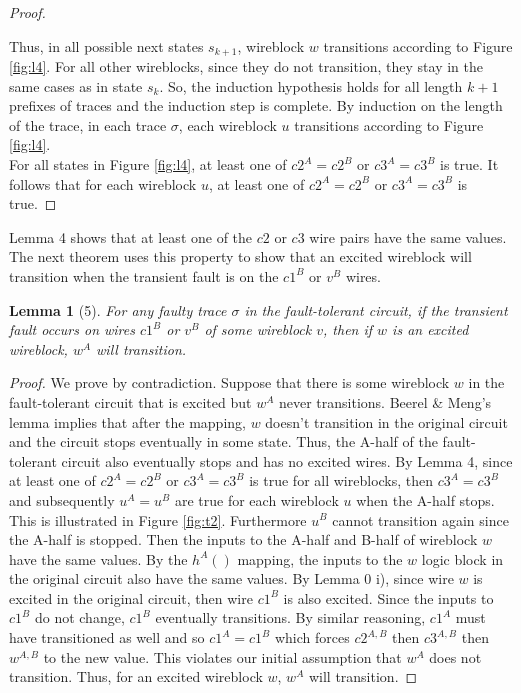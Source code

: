 \documentclass[12pt]{report}
\newtheorem*{lemma}{Lemma}
\begin{document}
\begin{proof}
\begin{itemize}
\end{itemize}
Thus, in all possible next states $s_{k+1}$, wireblock $w$ transitions according to Figure \ref{fig:l4}. For all other wireblocks, since they do not transition, they stay in the same cases as in state $s_k$. So, the induction hypothesis holds for all length $k+1$ prefixes of traces and the induction step is complete. 
By induction on the length of the trace, in each trace $\sigma$, each wireblock $u$ transitions according to Figure \ref{fig:l4}. \\ 
For all states in Figure \ref{fig:l4}, at least one of $c2^A=c2^B$ or $c3^A=c3^B$ is true. It follows that for each wireblock $u$, at least one of $c2^A=c2^B$ or $c3^A=c3^B$ is true.
\end{proof}
Lemma 4 shows that at least one of the $c2$ or $c3$ wire pairs have the same values. The next theorem uses this property to show that an excited wireblock will transition when the transient fault is on the $c1^B$ or $v^B$ wires.\\

\begin{lemma}[5]
For any faulty trace $\sigma$ in the fault-tolerant circuit, if the transient fault occurs on wires $c1^B$ or $v^B$ of some wireblock $v$, then if $w$ is an excited wireblock, $w^A$ will transition.
\end{lemma}
\begin{proof}
We prove by contradiction. Suppose that there is some wireblock $w$ in the fault-tolerant circuit that is excited but $w^A$ never transitions. Beerel \& Meng's lemma implies that after the mapping, $w$ doesn't transition in the original circuit and the circuit stops eventually in some state. Thus, the A-half of the fault-tolerant circuit also eventually stops and has no excited wires. By Lemma 4, since at least one of $c2^A=c2^B$ or $c3^A=c3^B$ is true for all wireblocks, then $c3^A=c3^B$ and subsequently $u^A=u^B$ are true for each wireblock $u$ when the A-half stops.  This is illustrated in Figure \ref{fig:t2}.  Furthermore $u^B$ cannot transition again since the A-half is stopped.  Then the inputs to the A-half and B-half of wireblock $w$ have the same values.  By the $h^A()$ mapping, the inputs to the $w$ logic block in the original circuit also have the same values.  By Lemma 0 i), since wire $w$ is excited in the original circuit, then wire $c1^B$ is also excited. Since the inputs to $c1^B$ do not change, $c1^B$ eventually transitions. By similar reasoning, $c1^A$ must have transitioned as well and so $c1^A=c1^B$ which forces $c2^{A,B}$ then $c3^{A,B}$ then $w^{A,B}$ to the new value.  This violates our initial assumption that $w^A$ does not transition.  Thus, for an excited wireblock $w$, $w^A$ will transition. 
\end{proof}
\end{document}
